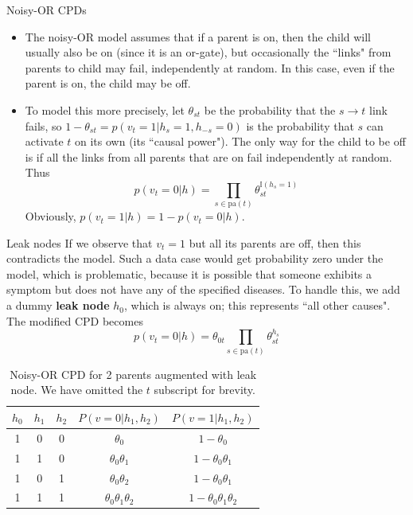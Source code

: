 \documentclass[10pt,mathserif]{beamer}
\begin{document}
\begin{frame}{Noisy-OR CPDs}
\begin{itemize}
    \item  The noisy-OR model assumes that if a parent is on, then the child will usually also be on (since it is an or-gate), but occasionally the ``links" from parents to child may fail, independently at random. In this case, even if the parent is on, the child may be off.
    \item  To model this more precisely, let $\theta_{st}$ be the probability that the $s\rightarrow t$ link fails, so $1-\theta_{st} =p(v_t =1|h_s =1,h_{-s} =0)$ is the probability that $s$ can activate $t$ on its own (its ``causal power"). The only way for the child to be off is if all the links from all parents that are on fail independently at random. Thus
    \begin{equation}
        p(v_t =0|h)= \prod_{s\in\text{pa}(t)}\theta_{st}^{\mathbb{I}(h_s=1)}
    \end{equation}
    Obviously, $p(v_t = 1|h) = 1 - p(v_t = 0|h)$.
\end{itemize}
\end{frame}

\begin{frame}{Leak nodes}
If we observe that $v_t = 1$ but all its parents are off, then this contradicts the model. Such a data case would get probability zero under the model, which is problematic, because it is possible that someone exhibits a symptom but does not have any of the specified diseases. To handle this, we add a dummy \textbf{leak node} $h_0$, which is always on; this represents ``all other causes". The modified CPD becomes
\begin{equation}
    p(v_t =0|h)= \theta_{0t} \prod_{s\in\text{pa}(t)}\theta_{st}^{h_s}
\end{equation}

\begin{table}[h!]
    \centering
    \begin{tabular}{c c c|c c}
        $h_0$ & $h_1$ & $h_2$ & $P(v = 0|h_1, h_2)$ & $P(v = 1|h_1, h_2)$\\
        \hline
        1 & 0 & 0 & $\theta_0$ & $1-\theta_0$\\
        1 & 1 & 0 & $\theta_0\theta_1 $ & $1-\theta_0\theta_1$\\
        1 & 0 & 1 & $\theta_0\theta_2 $ & $1-\theta_0\theta_1$\\
        1 & 1 & 1 & $\theta_0\theta_1\theta_2$ & $1-\theta_0\theta_1\theta_2$\\
    \end{tabular}
    \caption{Noisy-OR CPD for 2 parents augmented with leak node. We have omitted the $t$ subscript for brevity.}
\end{table}   
\end{frame}
\end{document}
